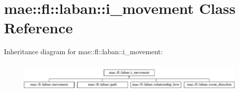 \hypertarget{classmae_1_1fl_1_1laban_1_1i__movement}{\section{mae\-:\-:fl\-:\-:laban\-:\-:i\-\_\-movement Class Reference}
\label{classmae_1_1fl_1_1laban_1_1i__movement}
}
Inheritance diagram for mae\-:\-:fl\-:\-:laban\-:\-:i\-\_\-movement\-:\begin{figure}[H]
\begin{center}
\leavevmode
\includegraphics[height=1.443299cm]{classmae_1_1fl_1_1laban_1_1i__movement}
\end{center}
\end{figure}
